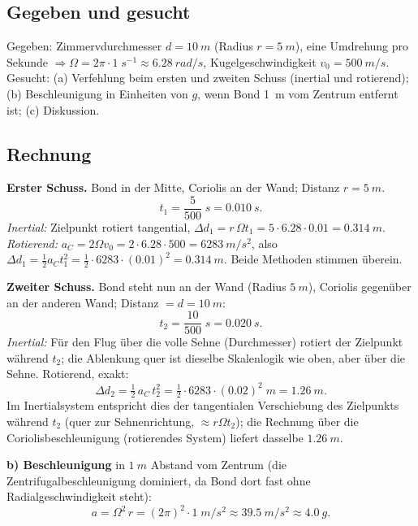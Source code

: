 
\subsection*{Gegeben und gesucht}
Gegeben: Zimmervdurchmesser $d=\qty{10}{m}$ (Radius $r=\qty{5}{m}$), eine
Umdrehung pro Sekunde $\Rightarrow \Omega=2\pi\cdot 1\;\si{s^{-1}}\approx
\qty{6.28}{rad/s}$, Kugelgeschwindigkeit $v_0=\qty{500}{m/s}$.
Gesucht: (a) Verfehlung beim ersten und zweiten Schuss (inertial und
rotierend); (b) Beschleunigung in Einheiten von $g$, wenn Bond
\qty{1}{m} vom Zentrum entfernt ist; (c) Diskussion.

\subsection*{Rechnung}
\textbf{Erster Schuss.} Bond in der Mitte, Coriolis an der Wand; Distanz
$r=\qty{5}{m}$.
\begin{equation}
  t_1 = \frac{5}{500}\;\si{s} = \qty{0.010}{s}.
\end{equation}
\emph{Inertial:} Zielpunkt rotiert tangential, $\Delta d_1 = r\,\Omega t_1
= 5\cdot 6.28\cdot 0.01=\qty{0.314}{m}$.
\emph{Rotierend:} $a_C=2\Omega v_0=2\cdot6.28\cdot500=\qty{6283}{m/s^2}$, also
$\Delta d_1=\tfrac12 a_C t_1^2 = \tfrac12\cdot6283\cdot(0.01)^2
=\qty{0.314}{m}$. Beide Methoden stimmen überein.

\textbf{Zweiter Schuss.} Bond steht nun an der Wand (Radius $\qty{5}{m}$),
Coriolis gegenüber an der anderen Wand; Distanz $=d=\qty{10}{m}$:
\begin{equation}
  t_2 = \frac{10}{500}\;\si{s} = \qty{0.020}{s}.
\end{equation}
\emph{Inertial:} Für den Flug über die volle Sehne (Durchmesser) rotiert der
Zielpunkt während $t_2$; die Ablenkung quer ist dieselbe Skalenlogik wie oben,
aber über die Sehne. Rotierend, exakt:
\begin{equation}
  \Delta d_2
  = \tfrac12\,a_C\,t_2^2
  = \tfrac12\cdot 6283\cdot (0.02)^2\;\si{m}
  = \qty{1.26}{m}.
\end{equation}
Im Inertialsystem entspricht dies der tangentialen Verschiebung des
Zielpunkts während $t_2$ (quer zur Sehnenrichtung, $\approx r\Omega t_2$);
die Rechnung über die Coriolisbeschleunigung (rotierendes System) liefert
dasselbe $\qty{1.26}{m}$.

\textbf{b) Beschleunigung} in $\qty{1}{m}$ Abstand vom Zentrum (die
Zentrifugalbeschleunigung dominiert, da Bond dort fast ohne Radialgeschwindigkeit
steht):
\begin{equation}
  a = \Omega^2\, r = (2\pi)^2\cdot 1\;\si{m/s^2}
  \approx \qty{39.5}{m/s^2}
  \approx \qty{4.0}{g}.
\end{equation}

